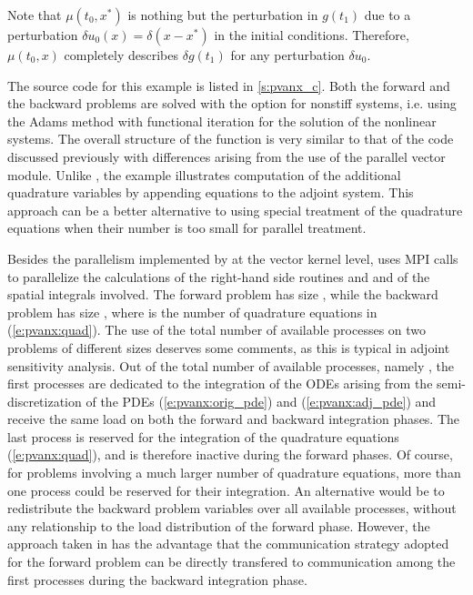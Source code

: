 Note that $\mu(t_0 , x^*)$ is nothing but the perturbation in $g(t_1)$
due to a perturbation $\delta u_0(x) = \delta(x-x^*)$ in the initial conditions.
Therefore, $\mu(t_0,x)$ completely describes $\delta g(t_1)$ for any
perturbation $\delta u_0$.

The source code for this example is listed in \A\ref{s:pvanx_c}. Both the forward
and the backward problems are solved with the option for nonstiff systems,
i.e. using the Adams method with functional iteration for the solution of
the nonlinear systems. The overall structure of the  function is very
similar to that of the code  discussed previously with 
differences arising from the use of the parallel vector module. Unlike 
, the example  illustrates computation of the additional
quadrature variables by appending  equations to the adjoint system.
This approach can be a better alternative to using special treatment
of the quadrature equations when their number is too small for parallel 
treatment.

Besides the parallelism implemented by {\cvodes} at the vector kernel level,
 uses MPI calls to parallelize the calculations of the right-hand side
routines  and  and of the spatial integrals involved.
The forward problem has size , while the backward problem has
size , where  is the number of quadrature equations
in (\ref{e:pvanx:quad}).
The use of the total number of available processes on two problems of different 
sizes deserves some comments, as this is typical in adjoint sensitivity 
analysis. Out of the total number of available processes, namely ,
the first  processes are dedicated to the integration of
the ODEs arising from the semi-discretization of the PDEs 
(\ref{e:pvanx:orig_pde}) and (\ref{e:pvanx:adj_pde}) and receive
the same load on both the forward and backward integration phases. 
The last process is reserved for the integration of the quadrature equations 
(\ref{e:pvanx:quad}), and is therefore inactive during the forward phases.
Of course, for problems involving a much larger number of quadrature equations,
more than one process could be reserved for their integration. 
An alternative would be to redistribute the  backward problem variables 
over all available processes, without any relationship to the load distribution 
of the forward phase. However, the approach taken in  has the 
advantage that the communication strategy adopted for the forward problem 
can be directly transfered to communication among the first 
processes during the backward integration phase. 

